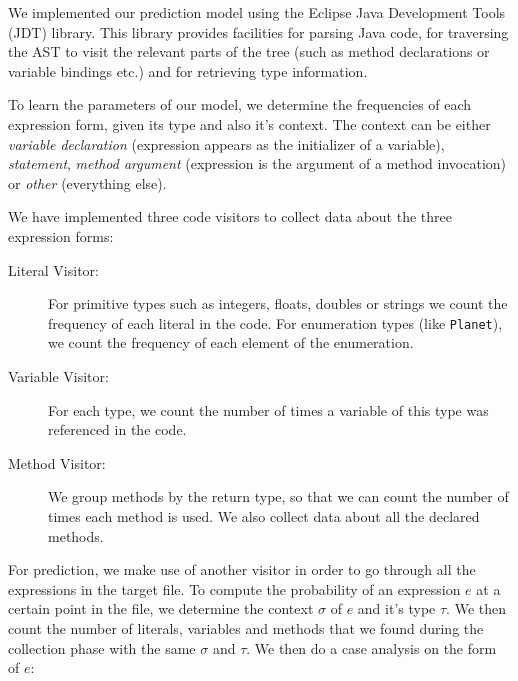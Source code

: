 \documentclass{article} %
\begin{document}
We implemented our prediction model using the Eclipse Java Development Tools (JDT) library. This library provides facilities for parsing Java code, for traversing the AST to visit the relevant parts of the tree (such as method declarations or variable bindings etc.) and for retrieving type information.

To learn the parameters of our model, we determine the frequencies of each expression form, given its type and also it's context.
The context can be either \textit{variable declaration} (expression appears as the initializer of a variable), \textit{statement}, \textit{method argument} (expression is the argument of a method invocation) or \textit{other} (everything else).

We have implemented three code visitors to collect data about the three expression forms:

\begin{description}
   \item[Literal Visitor:] For primitive types such as integers, floats, doubles or strings we count the frequency of each literal in the code. For enumeration types (like \texttt{Planet}), we count the frequency of each element of the enumeration.

   \item[Variable Visitor:] For each type, we count the number of times a variable of this type was referenced in the code.

   \item[Method Visitor:] We group methods by the return type, so that we can count the number of times each method is used. We also collect data about all the declared methods.
\end{description}

For prediction, we make use of another visitor in order to go through all the expressions in the target file. To compute the probability of an expression $e$ at a certain point in the file, we determine the context $\sigma$ of $e$ and it's type $\tau$. We
then count the number of literals, variables and methods that we found during the collection phase with the same $\sigma$ and $\tau$. We then do a case analysis on the form of $e$:
\end{document}
